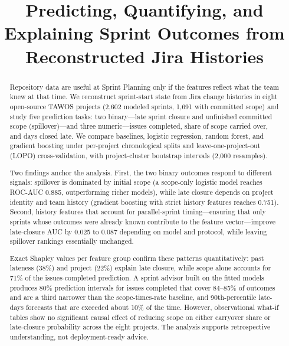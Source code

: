 \documentclass[conference]{IEEEtran}
\begin{document}
\pagestyle{empty}

\title{Predicting, Quantifying, and Explaining Sprint Outcomes from Reconstructed Jira Histories}

\author{
\and
{}
\and
{}
}
\maketitle
\thispagestyle{empty}

\begin{abstract}
Repository data are useful at Sprint Planning only if the features reflect what the team knew at that time.
We reconstruct sprint-start state from Jira change histories in eight open-source TAWOS projects (2,602 modeled sprints, 1,691 with committed scope) and study five prediction tasks: two binary---late sprint closure and unfinished committed scope (spillover)---and three numeric---issues completed, share of scope carried over, and days closed late.
We compare baselines, logistic regression, random forest, and gradient boosting under per-project chronological splits and leave-one-project-out (LOPO) cross-validation, with project-cluster bootstrap intervals (2,000 resamples).

Two findings anchor the analysis.
First, the two binary outcomes respond to different signals: spillover is dominated by initial scope (a scope-only logistic model reaches ROC-AUC 0.885, outperforming richer models), while late closure depends on project identity and team history (gradient boosting with strict history features reaches 0.751).
Second, history features that account for parallel-sprint timing---ensuring that only sprints whose outcomes were already known contribute to the feature vector---improve late-closure AUC by 0.025 to 0.087 depending on model and protocol, while leaving spillover rankings essentially unchanged.

Exact Shapley values per feature group confirm these patterns quantitatively: past lateness (38\%) and project (22\%) explain late closure, while scope alone accounts for 71\% of the issues-completed prediction.
A sprint advisor built on the fitted models produces 80\% prediction intervals for issues completed that cover 84--85\% of outcomes and are a third narrower than the scope-times-rate baseline, and 90th-percentile late-days forecasts that are exceeded about 10\% of the time.
However, observational what-if tables show no significant causal effect of reducing scope on either carryover share or late-closure probability across the eight projects.
The analysis supports retrospective understanding, not deployment-ready advice.
\end{abstract}
\end{document}
